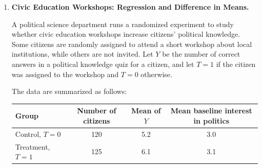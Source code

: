 \documentclass[12pt]{article}
\begin{document}
\begin{enumerate}
\begin{enumerate}[label=(\alph*)]
        \item This is outside range, because 65 is higher than the maximum value of \texttt{rent\_burden} observed in the estimation sample, which is 55. This matters because the model would be extrapolating beyond the data used to estimate the relationship.
        
        \item One possible transformed linear model is
        \[
            \text{support}
            = \beta_0 + \beta_1\text{rent\_burden}
            + \beta_2\text{rent\_burden}^2
            + \beta_3\text{urban} + u.
        \]
        This model allows the effect of rent burden to be nonlinear, but it is still linear in the parameters \(\beta_0, \beta_1, \beta_2, \beta_3\).
    \end{enumerate}
    \fi \color{black}

    \item \textbf{Civic Education Workshops: Regression and Difference in Means.}
    
    A political science department runs a randomized experiment to study whether civic education workshops increase citizens' political knowledge. Some citizens are randomly assigned to attend a short workshop about local institutions, while others are not invited. Let \(Y\) be the number of correct answers in a political knowledge quiz for a citizen, and let \(T=1\) if the citizen was assigned to the workshop and \(T=0\) otherwise.
    
    The data are summarized as follows:
    \begin{center}
    \begin{tabular}{lccc}
        \toprule
        Group & Number of citizens & Mean of \(Y\) & Mean baseline interest in politics \\
        \midrule
        Control, \(T=0\) & 120 & 5.2 & 3.0 \\
        Treatment, \(T=1\) & 125 & 6.1 & 3.1 \\
        \bottomrule
    \end{tabular}
    \end{center}
    

\end{enumerate}
\end{document}
